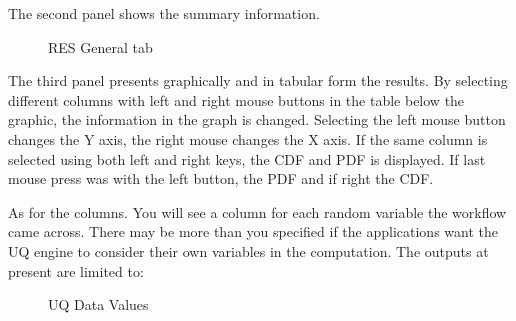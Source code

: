 The second panel shows the summary information.

\begin{figure}[!htbp]
  \caption{RES General tab}
  \label{fig:figure13}
\end{figure}

The third panel presents graphically and in tabular form the results. By selecting different columns with left and right mouse buttons in the table below the graphic, 
the information in the graph is changed. Selecting the left mouse button changes the Y axis, the right mouse changes the X axis. If the same column is selected 
using both left and right keys, the CDF and PDF is displayed. If last mouse press was with the left button, the PDF and if right the CDF.

As for the columns. You will see a column for each random variable the workflow came across. There may be more than you specified if the applications want the 
UQ engine to consider their own variables in the computation. The outputs at present are limited to:



\begin{figure}[!htbp]
  \caption{UQ Data Values}
  \label{fig:figure14}
\end{figure}



